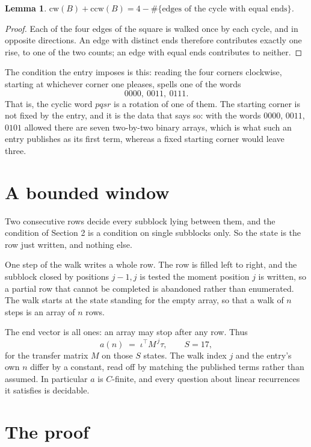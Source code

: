 \documentclass[11pt,a4paper]{article}
\theoremstyle{plain}
\newtheorem{lemma}[theorem]{Lemma}
\theoremstyle{definition}
\begin{document}
\begin{lemma}\label{lem:sum}
$\mathrm{cw}(B)+\mathrm{ccw}(B)=4-\#\{\text{edges of the cycle with equal ends}\}$.
\end{lemma}

\begin{proof}
Each of the four edges of the square is walked once by each cycle, and in opposite directions.
An edge with distinct ends therefore contributes exactly one rise, to one of the two counts;
an edge with equal ends contributes to neither.
\end{proof}

The condition the entry imposes is this: reading the four corners clockwise, starting at whichever corner one pleases, spells one of the words
\[
0000,\ 0011,\ 0111.
\]
That is, the cyclic word $pqsr$ is a rotation of one of them. The starting corner is not fixed by the entry, and it is the data that says so: with the words $0000$, $0011$, $0101$ allowed there are seven two-by-two binary arrays, which is what such an entry publishes as its first term, whereas a fixed starting corner would leave three.

\section{A bounded window}

Two consecutive rows decide every subblock lying between them, and the condition of Section 2 is a condition on single subblocks only. So the state is the row just written, and nothing else.

One step of the walk writes a whole row. The row is filled left to right, and the subblock
closed by positions $j-1,j$ is tested the moment position $j$ is written, so a partial row that
cannot be completed is abandoned rather than enumerated. The walk starts at the state standing
for the empty array, so that a walk of $n$ steps is an array of $n$ rows.

The end vector is all ones: an array may stop after any row. Thus
\[
a(n)\;=\;\iota^{\!\top}M^{\,j}\tau ,\qquad S=17,
\]
for the transfer matrix $M$ on those $S$ states. The walk index $j$ and the entry's own $n$
differ by a constant, read off by matching the published terms rather than assumed. In
particular $a$ is $C$-finite, and every question about linear recurrences it satisfies is
decidable.

\section{The proof}
\end{document}
